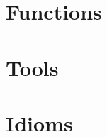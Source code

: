 \documentclass{beamer}
\begin{document}

\section{Functions}

\section{Tools}

\section{Idioms}

\begin{frame}
\end{frame}
\end{document}
